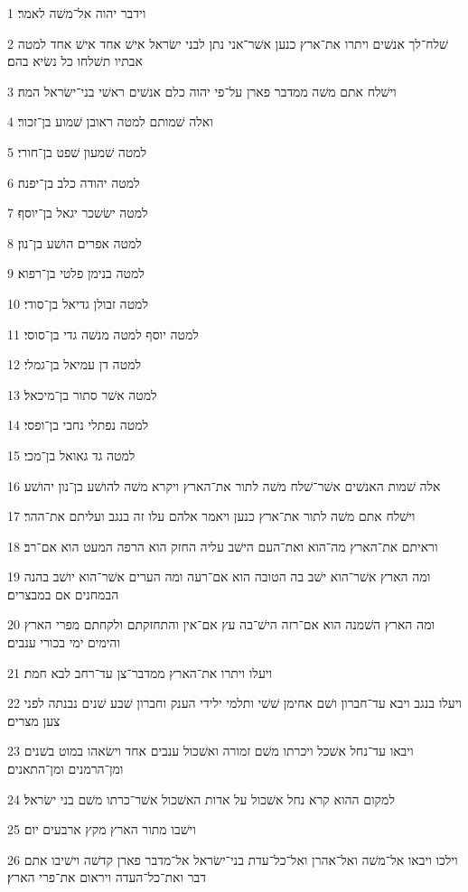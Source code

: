 \par 1 וידבר יהוה אל־משׁה לאמר׃
\par 2 שׁלח־לך אנשׁים ויתרו את־ארץ כנען אשׁר־אני נתן לבני ישׂראל אישׁ אחד אישׁ אחד למטה אבתיו תשׁלחו כל נשׂיא בהם׃
\par 3 וישׁלח אתם משׁה ממדבר פארן על־פי יהוה כלם אנשׁים ראשׁי בני־ישׂראל המה׃
\par 4 ואלה שׁמותם למטה ראובן שׁמוע בן־זכור׃
\par 5 למטה שׁמעון שׁפט בן־חורי׃
\par 6 למטה יהודה כלב בן־יפנה׃
\par 7 למטה ישׂשכר יגאל בן־יוסף׃
\par 8 למטה אפרים הושׁע בן־נון׃
\par 9 למטה בנימן פלטי בן־רפוא׃
\par 10 למטה זבולן גדיאל בן־סודי׃
\par 11 למטה יוסף למטה מנשׁה גדי בן־סוסי׃
\par 12 למטה דן עמיאל בן־גמלי׃
\par 13 למטה אשׁר סתור בן־מיכאל׃
\par 14 למטה נפתלי נחבי בן־ופסי׃
\par 15 למטה גד גאואל בן־מכי׃
\par 16 אלה שׁמות האנשׁים אשׁר־שׁלח משׁה לתור את־הארץ ויקרא משׁה להושׁע בן־נון יהושׁע׃
\par 17 וישׁלח אתם משׁה לתור את־ארץ כנען ויאמר אלהם עלו זה בנגב ועליתם את־ההר׃
\par 18 וראיתם את־הארץ מה־הוא ואת־העם הישׁב עליה החזק הוא הרפה המעט הוא אם־רב׃
\par 19 ומה הארץ אשׁר־הוא ישׁב בה הטובה הוא אם־רעה ומה הערים אשׁר־הוא יושׁב בהנה הבמחנים אם במבצרים׃
\par 20 ומה הארץ השׁמנה הוא אם־רזה הישׁ־בה עץ אם־אין והתחזקתם ולקחתם מפרי הארץ והימים ימי בכורי ענבים׃
\par 21 ויעלו ויתרו את־הארץ ממדבר־צן עד־רחב לבא חמת׃
\par 22 ויעלו בנגב ויבא עד־חברון ושׁם אחימן שׁשׁי ותלמי ילידי הענק וחברון שׁבע שׁנים נבנתה לפני צען מצרים׃
\par 23 ויבאו עד־נחל אשׁכל ויכרתו משׁם זמורה ואשׁכול ענבים אחד וישׂאהו במוט בשׁנים ומן־הרמנים ומן־התאנים׃
\par 24 למקום ההוא קרא נחל אשׁכול על אדות האשׁכול אשׁר־כרתו משׁם בני ישׂראל׃
\par 25 וישׁבו מתור הארץ מקץ ארבעים יום׃
\par 26 וילכו ויבאו אל־משׁה ואל־אהרן ואל־כל־עדת בני־ישׂראל אל־מדבר פארן קדשׁה וישׁיבו אתם דבר ואת־כל־העדה ויראום את־פרי הארץ׃
